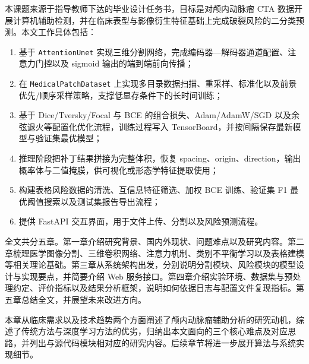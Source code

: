 本课题来源于指导教师下达的毕业设计任务书，目标是对颅内动脉瘤 CTA 数据开展计算机辅助检测，并在临床表型与影像衍生特征基础上完成破裂风险的二分类预测。本文工作具体包括：
\begin{enumerate}
	\item 基于 \texttt{AttentionUnet} 实现三维分割网络，完成编码器—解码器通道配置、注意力门控以及 sigmoid 输出的端到端前向传播；
	\item 在 \texttt{MedicalPatchDataset} 上实现多目录数据扫描、重采样、标准化以及前景优先/顺序采样策略，支撑低显存条件下的长时间训练；
	\item 基于 Dice/Tversky/Focal 与 BCE 的组合损失、Adam/AdamW/SGD 以及余弦退火等配置化优化流程，训练过程写入 TensorBoard，并按间隔保存最新模型与验证集最优模型；
	\item 推理阶段把补丁结果拼接为完整体积，恢复 spacing、origin、direction，输出概率体与二值掩膜，供可视化或形态学特征提取使用；
	\item 构建表格风险数据的清洗、互信息特征筛选、加权 BCE 训练、验证集 F1 最优阈值搜索以及测试集报告导出流程；
	\item 提供 FastAPI 交互界面，用于文件上传、分割以及风险预测流程。
\end{enumerate}

全文共分五章。第一章介绍研究背景、国内外现状、问题难点以及研究内容。第二章梳理医学图像分割、三维卷积网络、注意力机制、类别不平衡学习以及表格建模等相关理论基础。第三章从系统架构出发，分别说明分割模块、风险模块的模型设计与实现要点，并简要介绍 Web 服务接口。第四章介绍实验环境、数据集与预处理约定、评价指标以及结果分析框架，说明如何依据日志与配置文件复现指标。第五章总结全文，并展望未来改进方向。

本章从临床需求以及技术趋势两个方面阐述了颅内动脉瘤辅助分析的研究动机，综述了传统方法与深度学习方法的优劣，归纳出本文面向的三个核心难点及对应思路，并列出与源代码模块相对应的研究内容。后续章节将进一步展开算法与系统实现细节。
